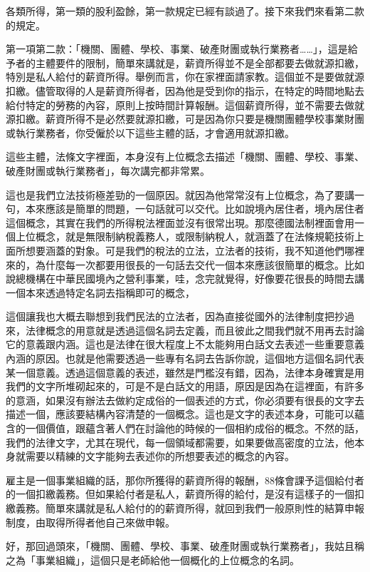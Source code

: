 \documentclass[]{ctexbook}
\begin{document}
各類所得，第一類的股利盈餘，第一款規定已經有談過了。接下來我們來看第二款的規定。

第一項第二款：「機關、團體、學校、事業、破產財團或執行業務者\ldots\ldots」，這是給予者的主體要件的限制，簡單來講就是，薪資所得並不是全部都要去做就源扣繳，特別是私人給付的薪資所得。舉例而言，你在家裡面請家教。這個並不是要做就源扣繳。儘管取得的人是薪資所得者，因為他是受到你的指示，在特定的時間地點去給付特定的勞務的內容，原則上按時間計算報酬。這個薪資所得，並不需要去做就源扣繳。薪資所得不是必然要就源扣繳，可是因為你只要是機關團體學校事業財團或執行業務者，你受僱於以下這些主體的話，才會適用就源扣繳。

這些主體，法條文字裡面，本身沒有上位概念去描述「機關、團體、學校、事業、破產財團或執行業務者」，每次講完都非常累。

這也是我們立法技術極差勁的一個原因。就因為他常常沒有上位概念，為了要講一句，本來應該是簡單的問題，一句話就可以交代。比如說境內居住者，境內居住者這個概念，其實在我們的所得稅法裡面並沒有很常出現。那麼德國法制裡面會用一個上位概念，就是無限制納稅義務人，或限制納稅人，就涵蓋了在法條規範技術上面所想要涵蓋的對象。可是我們的稅法的立法，立法者的技術，我不知道他們哪裡來的，為什麼每一次都要用很長的一句話去交代一個本來應該很簡單的概念。比如說總機構在中華民國境內之營利事業，哇，念完就覺得，好像要花很長的時間去講一個本來透過特定名詞去指稱即可的概念，

這個讓我也大概去聯想到我們民法的立法者，因為直接從國外的法律制度把抄過來，法律概念的用意就是透過這個名詞去定義，而且彼此之間我們就不用再去討論它的意義跟内涵。這也是法律在很大程度上不太能夠用白話文去表述一些重要意義內涵的原因。也就是他需要透過一些專有名詞去告訴你說，這個地方這個名詞代表某一個意義。透過這個意義的表述，雖然是門檻沒有錯，因為，法律本身確實是用我們的文字所堆砌起來的，可是不是白話文的用語，原因是因為在這裡面，有許多的意涵，如果沒有辦法去做約定成俗的一個表述的方式，你必須要有很長的文字去描述一個，應該要結構內容清楚的一個概念。這也是文字的表述本身，可能可以蘊含的一個價值，跟蘊含著人們在討論他的時候的一個相約成俗的概念。不然的話，我們的法律文字，尤其在現代，每一個領域都需要，如果要做高密度的立法，他本身就需要以精練的文字能夠去表述你的所想要表述的概念的內容。

雇主是一個事業組織的話，那你所獲得的薪資所得的報酬，88條會課予這個給付者的一個扣繳義務。但如果給付者是私人，薪資所得的給付，是沒有這樣子的一個扣繳義務。簡單來講就是私人給付的的薪資所得，就回到我們一般原則性的結算申報制度，由取得所得者他自己來做申報。

好，那回過頭來，「機關、團體、學校、事業、破產財團或執行業務者」，我姑且稱之為「事業組織」，這個只是老師給他一個概化的上位概念的名詞。
\end{document}
